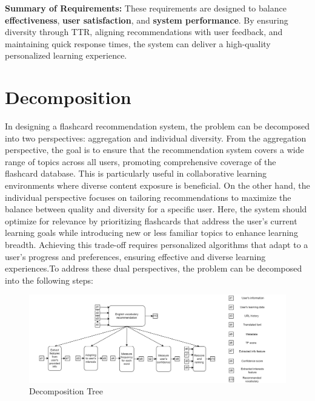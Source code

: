 \documentclass{article}
\begin{document}
\noindent \textbf{Summary of Requirements:}  
These requirements are designed to balance \textbf{effectiveness}, \textbf{user satisfaction}, and \textbf{system performance}. By ensuring diversity through TTR, aligning recommendations with user feedback, and maintaining quick response times, the system can deliver a high-quality personalized learning experience.


\section{Decomposition}
In designing a flashcard recommendation system, the problem can be decomposed into two perspectives: aggregation and individual diversity. From the aggregation perspective, the goal is to ensure that the recommendation system covers a wide range of topics across all users, promoting comprehensive coverage of the flashcard database. This is particularly useful in collaborative learning environments where diverse content exposure is beneficial. On the other hand, the individual perspective focuses on tailoring recommendations to maximize the balance between quality and diversity for a specific user. Here, the system should optimize for relevance by prioritizing flashcards that address the user's current learning goals while introducing new or less familiar topics to enhance learning breadth. Achieving this trade-off requires personalized algorithms that adapt to a user’s progress and preferences, ensuring effective and diverse learning experiences.To address these dual perspectives, the problem can be decomposed into the following steps: 

\begin{figure}[h!]
    \centering
    \includegraphics[width=0.9\linewidth]{decomposition-tree.png}
    \caption{Decomposition Tree}
    \label{fig:decomposition-tree}
\end{figure}
\end{document}
